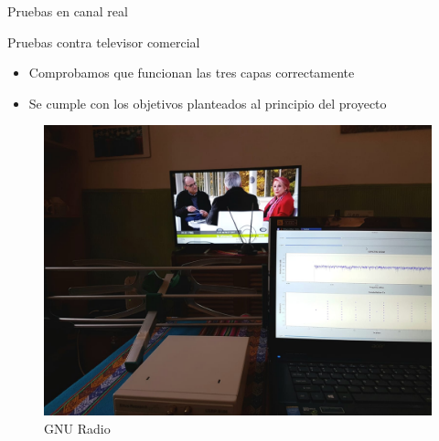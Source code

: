 \begin{frame}{Pruebas en canal real}
\begin{block}{Pruebas contra televisor comercial}
	\begin{itemize}	
		\item { Comprobamos que funcionan las tres capas correctamente  }
		\item { Se cumple con los objetivos planteados al principio del proyecto }
	\end{itemize}
\end{block}

	\begin{figure}
	\includegraphics[scale=0.11]{contra_tele}
	\caption{GNU Radio}
	\end{figure}

\end{frame}